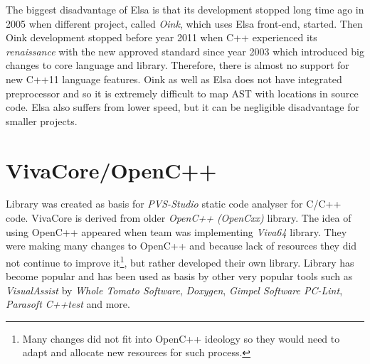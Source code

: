 The biggest disadvantage of Elsa is that its development stopped long time ago in 2005 when different project, called \emph{Oink}, which uses Elsa front-end, started. Then Oink development stopped before year 2011 when C++ experienced its \textit{renaissance} with the new approved standard since year 2003 which introduced big changes to core language and library. Therefore, there is almost no support for new C++11 language features. Oink as well as Elsa does not have integrated preprocessor and so it is extremely difficult to map AST with locations in source code. Elsa also suffers from lower speed, but it can be negligible disadvantage for smaller projects.

\section{VivaCore/OpenC++}
Library was created as basis for \emph{PVS-Studio} static code analyser for C/C++ code. VivaCore is derived from older \emph{OpenC++ (OpenCxx)} library. The idea of using OpenC++ appeared when team was implementing \emph{Viva64} library. They were making many changes to OpenC++ and because lack of resources they did not continue to improve it\footnote{Many changes did not fit into OpenC++ ideology so they would need to adapt and allocate new resources for such process.}, but rather developed their own library. Library has become popular and has been used as basis by other very popular tools such as  \emph{VisualAssist} by \emph{Whole Tomato Software}, \emph{Doxygen}, \emph{Gimpel Software PC-Lint}, \emph{Parasoft C++test} and more.


